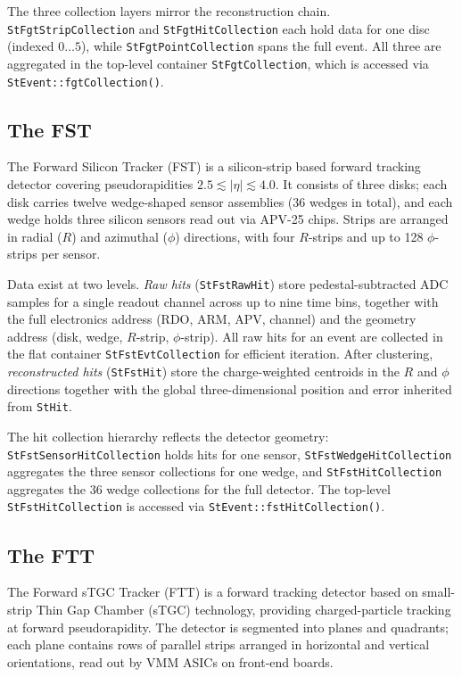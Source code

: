 \documentclass[twoside]{article}
\begin{document}
The three collection layers mirror the reconstruction chain.  \texttt{StFgtStripCollection}
and \texttt{StFgtHitCollection} each hold data for one disc (indexed $0\ldots5$), while
\texttt{StFgtPointCollection} spans the full event.  All three are aggregated in the
top-level container \texttt{StFgtCollection}, which is accessed via
\texttt{StEvent::fgtCollection()}.

\subsection{The FST}
The Forward Silicon Tracker (FST) is a silicon-strip based forward tracking detector
covering pseudorapidities $2.5 \lesssim |\eta| \lesssim 4.0$.  It consists of three
disks; each disk carries twelve wedge-shaped sensor assemblies (36 wedges in total), and
each wedge holds three silicon sensors read out via APV-25 chips.  Strips are arranged in
radial ($R$) and azimuthal ($\phi$) directions, with four $R$-strips and up to 128
$\phi$-strips per sensor.

Data exist at two levels.  \emph{Raw hits} (\texttt{StFstRawHit}) store pedestal-subtracted
ADC samples for a single readout channel across up to nine time bins, together with the
full electronics address (RDO, ARM, APV, channel) and the geometry address (disk, wedge,
$R$-strip, $\phi$-strip).  All raw hits for an event are collected in the flat container
\texttt{StFstEvtCollection} for efficient iteration.  After clustering, \emph{reconstructed
hits} (\texttt{StFstHit}) store the charge-weighted centroids in the $R$ and $\phi$
directions together with the global three-dimensional position and error inherited from
\texttt{StHit}.

The hit collection hierarchy reflects the detector geometry:
\texttt{StFstSensorHitCollection} holds hits for one sensor,
\texttt{StFstWedgeHitCollection} aggregates the three sensor collections for one wedge,
and \texttt{StFstHitCollection} aggregates the 36 wedge collections for the full detector.
The top-level \texttt{StFstHitCollection} is accessed via
\texttt{StEvent::fstHitCollection()}.

\subsection{The FTT}
The Forward sTGC Tracker (FTT) is a forward tracking detector based on small-strip Thin
Gap Chamber (sTGC) technology, providing charged-particle tracking at forward
pseudorapidity.  The detector is segmented into planes and quadrants; each plane contains
rows of parallel strips arranged in horizontal and vertical orientations, read out by VMM
ASICs on front-end boards.
\end{document}
